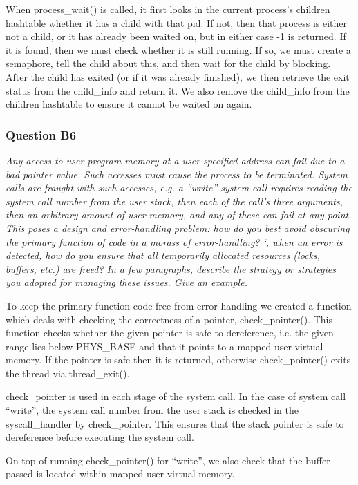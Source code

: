 When process\_wait() is called, it first looks in the current process's children hashtable whether it has a child with that pid. If not, then that process is either not a child, or it has already been waited on, but in either case -1 is returned. If it is found, then we must check whether it is still running. If so, we must create a semaphore, tell the child about this, and then wait for the child by blocking. After the child has exited (or if it was already finished), we then retrieve the exit status from the child\_info and return it. We also remove the child\_info from the children hashtable to ensure it cannot be waited on again.

\subsubsection*{Question B6} %
\textit{Any access to user program memory at a user-specified address can fail due to a bad pointer value.  Such accesses must cause the process to be terminated.  System calls are fraught with such accesses, e.g. a ``write'' system call requires reading the system call number from the user stack, then each of the call's three arguments, then an arbitrary amount of user memory, and any of these can fail at any point.  This poses a design and error-handling problem: how do you best avoid obscuring the primary function of code in a morass of error-handling?  `, when an error is detected, how do you ensure that all temporarily allocated resources (locks, buffers, etc.) are freed?  In a few paragraphs, describe the strategy or strategies you adopted for managing these issues.  Give an example.}

To keep the primary function code free from error-handling we created a function which deals with checking the correctness of a pointer, check\_pointer(). This function checks whether the given pointer is safe to dereference, i.e. the given range lies below PHYS\_BASE and that it points to a mapped user virtual memory. If the pointer is safe then it is returned, otherwise check\_pointer() exits the thread via thread\_exit().

check\_pointer is used in each stage of the system call. In the case of system call ``write'', the system call number from the user stack is checked in the syscall\_handler by check\_pointer. This ensures that the stack pointer is safe to dereference before executing the system call.

On top of running check\_pointer() for ``write'', we also check that the buffer passed is located within mapped user virtual memory.

